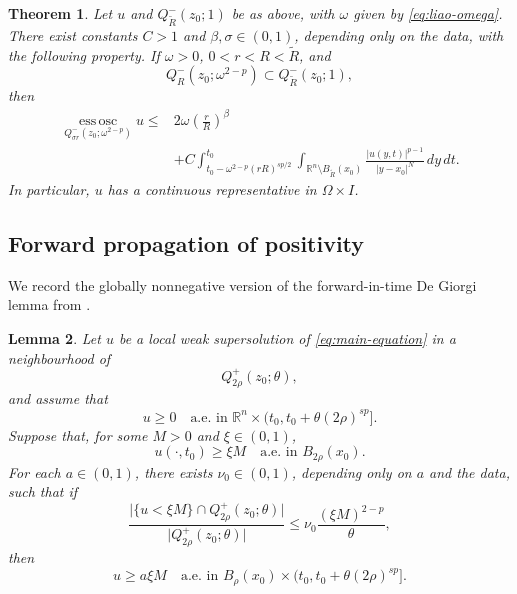 \documentclass[10pt]{amsart}
\theoremstyle{plain}
\newtheorem{lemma}{Lemma}[section]
\newtheorem{theorem}[lemma]{Theorem}
\theoremstyle{definition}
\theoremstyle{remark}
\numberwithin{equation}{section}
\newcommand{\R}{\mathbb R}
\begin{document}
\begin{theorem}\label{thm:liao-modulus}
Let $u$ and $Q^-_{\widetilde R}(z_0;1)$ be as above, with $\omega$
given by \eqref{eq:liao-omega}. There exist constants $C>1$ and
$\beta,\sigma\in(0,1)$, depending only on the data, with the following
property.
If $\omega>0$, $0<r<R<\widetilde R$, and
\[
Q^-_R(z_0;\omega^{2-p})
\subset Q^-_{\widetilde R}(z_0;1),
\]
then
\begin{equation}\label{eq:liao-modulus}
\begin{split}
\operatorname*{ess\,osc}_{Q^-_{\sigma r}(z_0;\omega^{2-p})}u
\le{}&
2\omega\left(\frac rR\right)^\beta
\\
&+C
\int_{t_0-\omega^{2-p}(rR)^{sp/2}}^{t_0}
\int_{\R^n\setminus B_{\widetilde R}(x_0)}
\frac{|u(y,t)|^{p-1}}{|y-x_0|^N}\,dy\,dt.
\end{split}
\end{equation}
In particular, $u$ has a continuous representative in $\Omega\times I$.
\end{theorem}

\subsection{Forward propagation of positivity}


We record the globally nonnegative version of the forward-in-time De Giorgi
lemma from \cite[Lemma~3.11]{APT}.

\begin{lemma}\label{lem:APT-forward}
Let $u$ be a local weak supersolution of \eqref{eq:main-equation} in a
neighbourhood of
\[
Q^+_{2\rho}(z_0;\theta),
\]
and assume that
\begin{equation}\label{eq:APT-global-nonnegative}
u\ge0
\quad\text{a.e. in }
\R^n\times(t_0,t_0+\theta(2\rho)^{sp}].
\end{equation}
Suppose that, for some $M>0$ and $\xi\in(0,1)$,
\begin{equation}\label{eq:APT-initial-positive}
u(\cdot,t_0)\ge\xi M
\quad\text{a.e. in }B_{2\rho}(x_0).
\end{equation}
For each $a\in(0,1)$, there exists $\nu_0\in(0,1)$, depending only on $a$ and
the data, such that if
\begin{equation}\label{eq:APT-small-measure}
\frac{
\bigl|\{u<\xi M\}\cap Q^+_{2\rho}(z_0;\theta)\bigr|
}{
\bigl|Q^+_{2\rho}(z_0;\theta)\bigr|
}
\le
\nu_0
\frac{(\xi M)^{2-p}}{\theta},
\end{equation}
then
\begin{equation}\label{eq:APT-positive-conclusion}
u\ge a\xi M
\quad\text{a.e. in }
B_\rho(x_0)\times(t_0,t_0+\theta(2\rho)^{sp}].
\end{equation}
\end{lemma}
\end{document}
